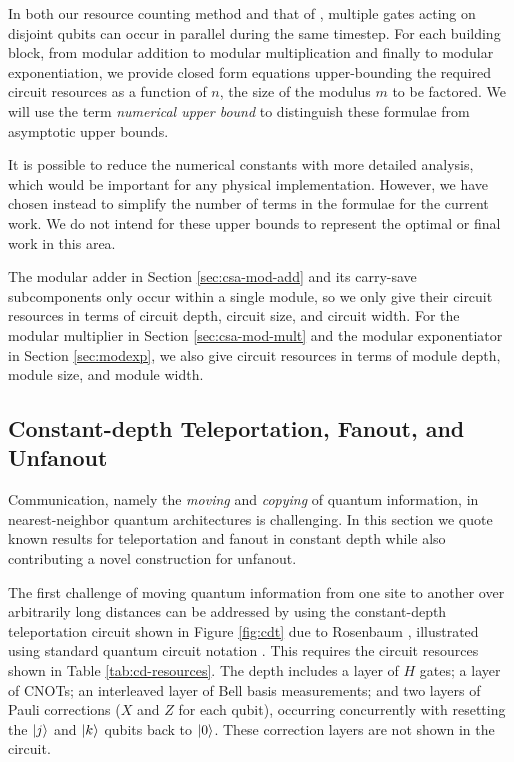 \documentclass[twoside]{article}
\begin{document}
In both our resource counting method and that of \cite{Fowler2004,Kutin2006}, multiple gates acting on disjoint qubits
can occur in parallel during the same timestep. For each building block,
from modular addition to modular multiplication and finally to modular
exponentiation, we provide closed form equations upper-bounding the required circuit
resources as a function of $n$, the size of the modulus $m$ to be factored.
We will use the
term \emph{numerical upper bound} to distinguish these formulae from asymptotic
upper bounds.

It is possible to reduce the numerical constants with more detailed analysis,
which would be important for any physical implementation.
However, we have chosen instead to simplify the number of terms in the formulae
for the current work. We do not intend for these upper bounds to represent
the optimal or final work in this area.

The modular adder in Section \ref{sec:csa-mod-add} and its carry-save
subcomponents only occur within a single module, so we only give their
circuit resources in terms of circuit depth, circuit size, and circuit width. 
For the modular multiplier in
Section \ref{sec:csa-mod-mult} and the modular exponentiator in
Section \ref{sec:modexp}, we also give circuit resources in
terms of module depth, module size, and module width.

\subsection{Constant-depth Teleportation, Fanout, and Unfanout}
\label{subsec:fanout}

Communication, namely the \emph{moving} and \emph{copying} of quantum information, in nearest-neighbor quantum architectures is challenging.
In this section we quote known results for teleportation and
fanout in constant depth while also contributing a novel construction
for unfanout.

The first challenge of moving quantum information from one site to another over
arbitrarily long distances can be addressed by using
the constant-depth teleportation circuit
shown in Figure \ref{fig:cdt} due to Rosenbaum \cite{Rosenbaum2012}, illustrated using standard quantum circuit
notation \cite{Nielsen2000}. This requires the circuit resources shown in
Table \ref{tab:cd-resources}. The depth includes a layer of $H$ gates; a layer of CNOTs; an interleaved layer of Bell basis measurements; and two layers of
Pauli corrections ($X$ and $Z$ for each qubit), occurring concurrently with
resetting the $\left\vert{j}\right\rangle$ and $\left\vert{k}\right\rangle$ qubits back to $\left\vert{0}\right\rangle$.
These correction layers are not shown in the circuit.
\end{document}
